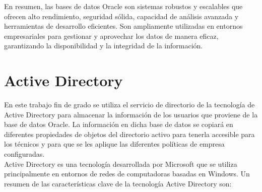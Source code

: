 \documentclass[a4paper, 12pt]{book}
\begin{document}
En resumen, las bases de datos Oracle son sistemas robustos y escalables que ofrecen alto rendimiento, seguridad sólida, capacidad de análisis avanzada y herramientas de desarrollo eficientes. Son ampliamente utilizadas en entornos empresariales para gestionar y aprovechar los datos de manera eficaz, garantizando la disponibilidad y la integridad de la información.

\section{Active Directory} 
\label{sec:Active Directory}

En este trabajo fin de grado se utiliza el servicio de directorio de la tecnología de Active Directory para almacenar la información de los usuarios que proviene de la base de datos Oracle. La información en dicha base de datos se copiará en diferentes propiedades de objetos del directorio activo para tenerla accesible para los técnicos y para que se les aplique las diferentes políticas de empresa configuradas.
\\

Active Directory es una tecnología desarrollada por Microsoft que se utiliza principalmente en entornos de redes de computadoras basadas en Windows. Un resumen de las características clave de la tecnología Active Directory son:
\end{document}
